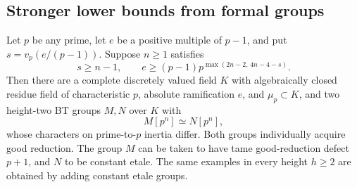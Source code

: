 \subsection{Stronger lower bounds from formal groups}

\begin{proposition}
\label{prop:B-RD18}
Let $p$ be any prime, let $e$ be a positive multiple of $p-1$, and
put $s=v_p(e/(p-1))$. Suppose $n\geq1$ satisfies
\[
 s\geq n-1,\qquad
 e\geq(p-1)p^{\max(2n-2,\,4n-4-s)}.                \tag{B-RD18.1}
\]
Then there are a complete discretely valued field $K$ with
algebraically closed residue field of characteristic $p$, absolute
ramification $e$, and $\mu_p\subset K$, and two height-two BT groups
$M,N$ over $K$ with
\[
 M[p^n]\simeq N[p^n],
\]
whose characters on prime-to-$p$ inertia differ. Both groups
individually acquire good reduction. The group $M$ can be taken to
have tame good-reduction defect $p+1$, and $N$ to be constant etale.
The same examples in every height $h\geq2$ are obtained by adding
constant etale groups.
\end{proposition}
